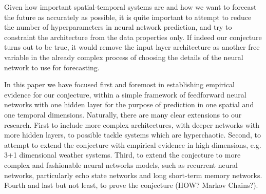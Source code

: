 \documentclass[journal]{IEEEtran}
\begin{document}
Given how important spatial-temporal systems are and how we want to forecast the future as accurately as possible, it is quite 
important to attempt to reduce the number of hyperparameters in neural network prediction, and try to constraint the architecture from 
the data properties only. If indeed our conjecture turns out to be true, it would remove the input layer architecture as another free 
variable in the already complex process of choosing the details of the neural network to use for forecasting.

In this paper we have focused first and foremost in establishing empirical evidence for our conjecture, within a simple framework of 
feedforward neural networks with one hidden layer for the purpose of prediction in one spatial and one temporal dimensions. Naturally, 
there are many clear extensions to our research. First to include more complex architectures, with deeper networks with more hidden 
layers, to possible tackle systems which are hyperchaotic. Second, to attempt to extend the conjecture with empirical evidence in high 
dimensions, e.g. 3+1 dimensional weather systems. Third, to extend the conjecture to more complex and fashionable
neural networks models, such as recurrent neural networks, particularly echo state networks and long short-term memory networks.
 Fourth and last but not least, to prove the conjecture (HOW? Markov Chains?).


%
\end{document}

